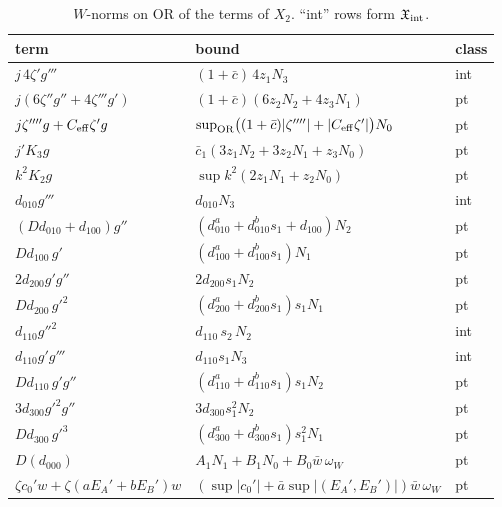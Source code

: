 \documentclass[11pt]{article}
\newcommand{\OR}{\mathrm{OR}}\newcommand{\eI}{\varepsilon_I}
\begin{document}
\begin{table}[h]\centering\small
\caption{$W$-norms on $\OR$ of the terms of $X_2$. ``int'' rows form $\mathfrak X_{\rm int}$.}\label{F:tab:X}
\begin{tabular}{@{}lll@{}}\toprule
term & bound & class\\\midrule
$j\,4\zeta'g'''$ & $(1+\bar c)\,4z_1N_3$ & int\\
$j(6\zeta''g''+4\zeta'''g')$ & $(1+\bar c)(6z_2N_2+4z_3N_1)$ & pt\\
$j\zeta''''g+C_{\rm eff}\zeta'g$ & $\sup_{\OR}\bigl((1+\bar c)|\zeta''''|+|C_{\rm eff}\zeta'|\bigr)N_0$ & pt\\
$j'K_3g$ & $\bar c_1(3z_1N_2+3z_2N_1+z_3N_0)$ & pt\\
$k^2K_2g$ & $\sup k^2(2z_1N_1+z_2N_0)$ & pt\\
$d_{010}g'''$ & $d_{010}N_3$ & int\\
$(Dd_{010}+d_{100})g''$ & $(d^a_{010}+d^b_{010}s_1+d_{100})N_2$ & pt\\
$Dd_{100}\,g'$ & $(d^a_{100}+d^b_{100}s_1)N_1$ & pt\\
$2d_{200}g'g''$ & $2d_{200}s_1N_2$ & pt\\
$Dd_{200}\,g'^2$ & $(d^a_{200}+d^b_{200}s_1)s_1N_1$ & pt\\
$d_{110}g''^2$ & $d_{110}\,s_2\,N_2$ & int\\
$d_{110}g'g'''$ & $d_{110}s_1N_3$ & int\\
$Dd_{110}\,g'g''$ & $(d^a_{110}+d^b_{110}s_1)s_1N_2$ & pt\\
$3d_{300}g'^2g''$ & $3d_{300}s_1^2N_2$ & pt\\
$Dd_{300}\,g'^3$ & $(d^a_{300}+d^b_{300}s_1)s_1^2N_1$ & pt\\
$D(d_{000})$ & $A_1N_1+B_1N_0+B_0\bar w\,\omega_W$ & pt\\
$\zeta c_0'w+\zeta(aE_A'+bE_B')w$ & $(\sup|c_0'|+\bar a\sup|(E_A',E_B')|)\bar w\,\omega_W$ & pt\\\bottomrule
\end{tabular}\end{table}
\end{document}

